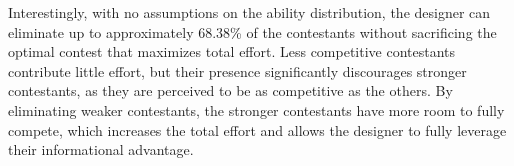 Interestingly, with no assumptions on the ability distribution, the designer can eliminate up to approximately 68.38\% of the contestants without sacrificing the optimal contest that maximizes total effort. Less competitive contestants contribute little effort, but their presence significantly discourages stronger contestants, as they are perceived to be as competitive as the others. By eliminating weaker contestants, the stronger contestants have more room to fully compete, which increases the total effort and allows the designer to fully leverage their informational advantage.
    




